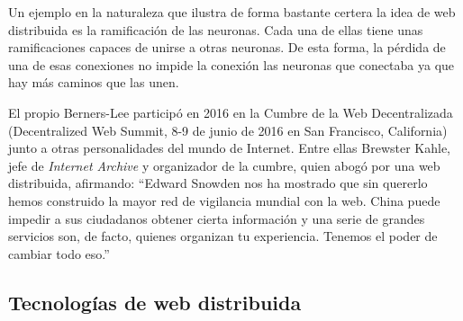 \documentclass[12pt]{article} %
\begin{document}
Un ejemplo en la naturaleza que ilustra de forma bastante certera la idea de web distribuida es la ramificación de las neuronas. Cada una de ellas tiene unas ramificaciones capaces de unirse a otras neuronas. De esta forma, la pérdida de una de esas conexiones no impide la conexión las neuronas que conectaba ya que hay más caminos que las unen.

El propio Berners-Lee participó en 2016 en la Cumbre de la Web Decentralizada (Decentralized Web Summit, 8-9 de junio de 2016 en San Francisco, California)\cite{decentralized-web-summit} junto a otras personalidades del mundo de Internet. Entre ellas Brewster Kahle, jefe de \textit{Internet Archive} y organizador de la cumbre, quien abogó por una web distribuida, afirmando: ``Edward Snowden nos ha mostrado que sin quererlo hemos construido la mayor red de vigilancia mundial con la web. China puede impedir a sus ciudadanos obtener cierta información y una serie de grandes servicios son, de facto, quienes organizan tu experiencia. Tenemos el poder de cambiar todo eso.''\cite{berners-lee-kahle-summit}

\subsection{Tecnologías de web distribuida} %
\label{sub:tecnologías_de_web_distribuida}
\end{document}
